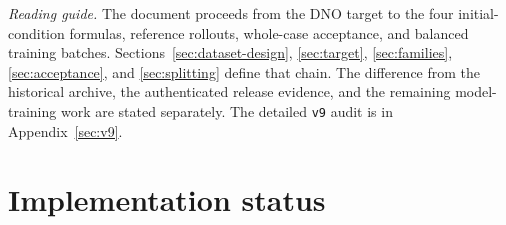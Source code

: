 \documentclass[11pt]{article}
\begin{document}
\tableofcontents
\clearpage

\noindent\textit{Reading guide.}
The document proceeds from the DNO target to the four initial-condition
formulas, reference rollouts, whole-case acceptance, and balanced training
batches.
Sections~\ref{sec:dataset-design}, \ref{sec:target}, \ref{sec:families},
\ref{sec:acceptance}, and \ref{sec:splitting} define that chain.  The
difference from the historical archive, the authenticated release evidence,
and the remaining model-training work are stated separately.  The
detailed \texttt{v9} audit is in Appendix~\ref{sec:v9}.

\section*{Implementation status}
\end{document}
